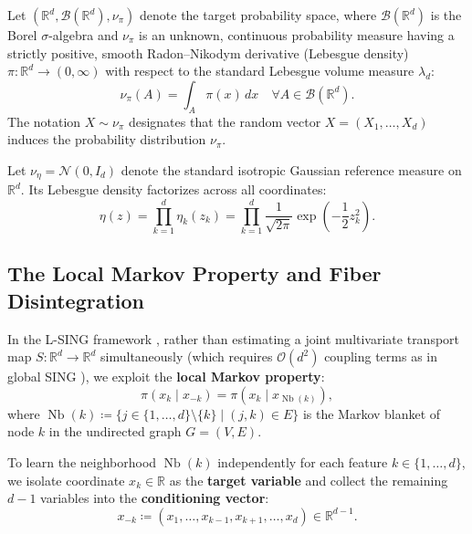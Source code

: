 \documentclass[11pt,a4paper]{article}
\theoremstyle{plain}
\theoremstyle{definition}
\theoremstyle{remark}
\begin{document}
Let $(\mathbb{R}^d, \mathcal{B}(\mathbb{R}^d), \nu_\pi)$ denote the target probability space, where $\mathcal{B}(\mathbb{R}^d)$ is the Borel $\sigma$-algebra and $\nu_\pi$ is an unknown, continuous probability measure having a strictly positive, smooth Radon--Nikodym derivative (Lebesgue density) $\pi: \mathbb{R}^d \to (0, \infty)$ with respect to the standard Lebesgue volume measure $\lambda_d$:
\begin{equation}
    \nu_\pi(A) = \int_A \pi(x) \, dx \quad \forall A \in \mathcal{B}(\mathbb{R}^d).
\end{equation}
The notation $X \sim \nu_\pi$ designates that the random vector $X = (X_1, \dots, X_d)$ induces the probability distribution $\nu_\pi$.

Let $\nu_\eta = \mathcal{N}(0, I_d)$ denote the standard isotropic Gaussian reference measure on $\mathbb{R}^d$. Its Lebesgue density factorizes across all coordinates:
\begin{equation}
    \eta(z) = \prod_{k=1}^d \eta_k(z_k) = \prod_{k=1}^d \frac{1}{\sqrt{2\pi}} \exp\left( -\frac{1}{2} z_k^2 \right).
\end{equation}

\subsection{The Local Markov Property and Fiber Disintegration}

In the L-SING framework \cite{liaw2025learning}, rather than estimating a joint multivariate transport map $S: \mathbb{R}^d \to \mathbb{R}^d$ simultaneously (which requires $\mathcal{O}(d^2)$ coupling terms as in global SING \cite{baptista2024learning, morrison2017beyond}), we exploit the \textbf{local Markov property}:
\begin{equation}
    \pi(x_k \mid x_{-k}) = \pi(x_k \mid x_{\operatorname{Nb}(k)}),
    \label{eq:local_markov}
\end{equation}
where $\operatorname{Nb}(k) \coloneqq \{ j \in \{1, \dots, d\} \setminus \{k\} \mid (j, k) \in E \}$ is the Markov blanket of node $k$ in the undirected graph $G = (V, E)$.

To learn the neighborhood $\operatorname{Nb}(k)$ independently for each feature $k \in \{1, \dots, d\}$, we isolate coordinate $x_k \in \mathbb{R}$ as the \textbf{target variable} and collect the remaining $d-1$ variables into the \textbf{conditioning vector}:
\begin{equation}
    x_{-k} \coloneqq (x_1, \dots, x_{k-1}, x_{k+1}, \dots, x_d) \in \mathbb{R}^{d-1}.
\end{equation}
\end{document}
